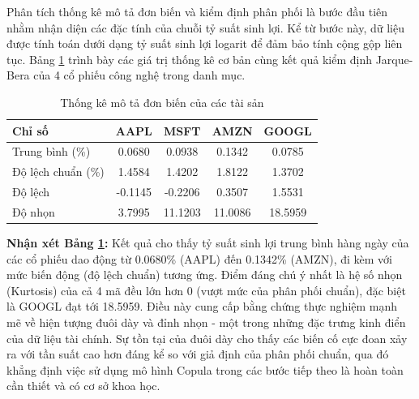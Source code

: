 Phân tích thống kê mô tả đơn biến và kiểm định phân phối là bước đầu tiên nhằm nhận diện các đặc tính của chuỗi tỷ suất sinh lợi. Kể từ bước này, dữ liệu được tính toán dưới dạng tỷ suất sinh lợi logarit để đảm bảo tính cộng gộp liên tục. Bảng \ref{tab:univariate} trình bày các giá trị thống kê cơ bản cùng kết quả kiểm định Jarque-Bera của 4 cổ phiếu công nghệ trong danh mục.

\begin{table}[H]
\centering
\caption{Thống kê mô tả đơn biến của các tài sản}
\begin{tabular}{|l|c|c|c|c|}
\hline
\textbf{Chỉ số} & \textbf{AAPL} & \textbf{MSFT} & \textbf{AMZN} & \textbf{GOOGL} \\
\hline
Trung bình (\%) & 0.0680 & 0.0938 & 0.1342 & 0.0785 \\
Độ lệch chuẩn (\%) & 1.4584 & 1.4202 & 1.8122 & 1.3702 \\
Độ lệch  & -0.1145 & -0.2206 & 0.3507 & 1.5531 \\
Độ nhọn  & 3.7995 & 11.1203 & 11.0086 & 18.5959 \\
\hline
\end{tabular}
\label{tab:univariate}
\end{table}

\textbf{Nhận xét Bảng \ref{tab:univariate}:} 
Kết quả cho thấy tỷ suất sinh lợi trung bình hàng ngày của các cổ phiếu dao động từ 0.0680\% (AAPL) đến 0.1342\% (AMZN), đi kèm với mức biến động (độ lệch chuẩn) tương ứng. Điểm đáng chú ý nhất là hệ số nhọn (Kurtosis) của cả 4 mã đều lớn hơn 0 (vượt mức của phân phối chuẩn), đặc biệt là GOOGL đạt tới 18.5959. Điều này cung cấp bằng chứng thực nghiệm mạnh mẽ về hiện tượng đuôi dày và đỉnh nhọn - một trong những đặc trưng kinh điển của dữ liệu tài chính. Sự tồn tại của đuôi dày cho thấy các biến cố cực đoan xảy ra với tần suất cao hơn đáng kể so với giả định của phân phối chuẩn, qua đó khẳng định việc sử dụng mô hình Copula trong các bước tiếp theo là hoàn toàn cần thiết và có cơ sở khoa học.